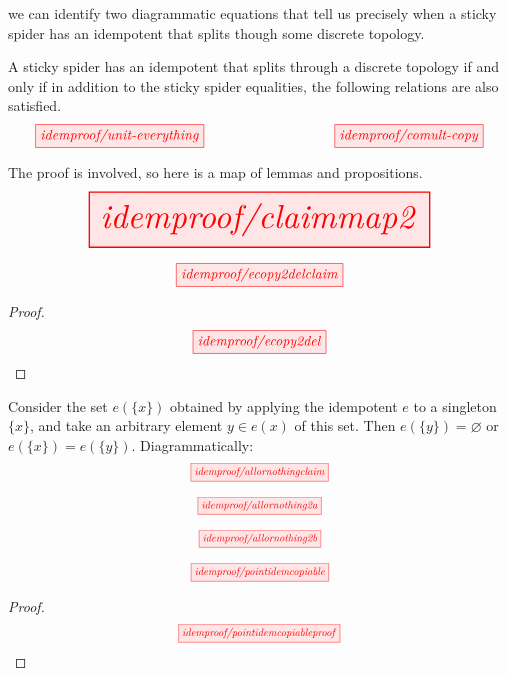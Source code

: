 \begin{myboxB}
 we can identify two diagrammatic equations that tell us precisely when a sticky spider has an idempotent that splits though some discrete topology.
\begin{theorem}\label{thm:stickygraphical}
A sticky spider has an idempotent that splits through a discrete topology if and only if in addition to the sticky spider equalities, the following relations are also satisfied.
\[\scalebox{1}{\tikzfig{idemproof/unit-everything}} \quad\quad\quad\quad\quad\quad\quad\quad \scalebox{1}{\tikzfig{idemproof/comult-copy}}\]
\end{theorem}
The proof is involved, so here is a map of lemmas and propositions.
\[\resizebox{0.8\textwidth}{!}{\tikzfig{idemproof/claimmap2}}\]
\end{myboxB}

\begin{myboxR}
\begin{proposition}\label{prop:counitdelete}
\[\scalebox{1}{\tikzfig{idemproof/ecopy2delclaim}}\]
\begin{proof}
\[\scalebox{1}{\tikzfig{idemproof/ecopy2del}}\]
\end{proof}
\end{proposition}
\end{myboxR}

\begin{myboxB}
\begin{lemma}\label{lem:allornothing}
Consider the set $e(\{x\})$ obtained by applying the idempotent $e$ to a singleton $\{x\}$, and take an arbitrary element $y \in e(x)$ of this set. Then $e(\{y\}) = \varnothing$ or $e(\{x\}) = e(\{y\})$. Diagrammatically: \[\scalebox{0.75}{\tikzfig{idemproof/allornothingclaim}}\]
\end{lemma}
\[\scalebox{0.75}{\tikzfig{idemproof/allornothing2a}}\]
\end{myboxB}
\begin{myboxB}
\[\scalebox{0.75}{\tikzfig{idemproof/allornothing2b}}\]
\end{myboxB}

\begin{myboxR}
\begin{proposition}\label{prop:epointcopy}
\[\scalebox{0.75}{\tikzfig{idemproof/pointidemcopiable}}\]
\begin{proof}
\[\scalebox{0.75}{\tikzfig{idemproof/pointidemcopiableproof}}\]
\end{proof}
\end{proposition}
\end{myboxR}

